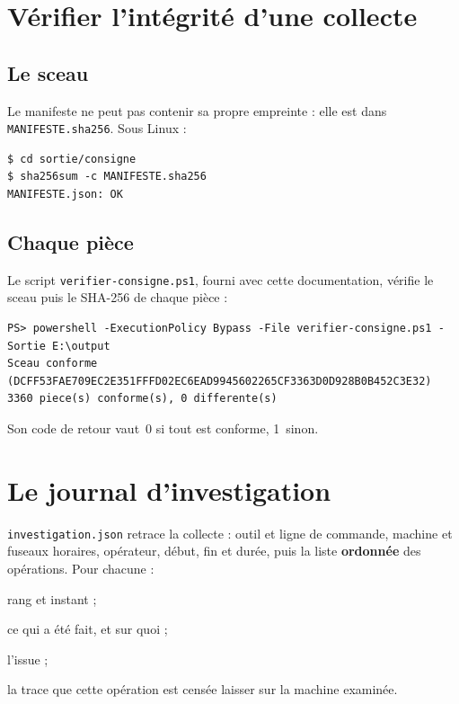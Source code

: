 \documentclass[11pt,a4paper,oneside]{report}
\newcommand{\champ}[1]{\texttt{#1}}
\newcommand{\fichier}[1]{\texttt{#1}}
\begin{document}
\section{Vérifier l'intégrité d'une collecte}\label{sec:verif}

\subsection{Le sceau}

Le manifeste ne peut pas contenir sa propre empreinte : elle est dans
\fichier{MANIFESTE.sha256}. Sous Linux :

\begin{lstlisting}
$ cd sortie/consigne
$ sha256sum -c MANIFESTE.sha256
MANIFESTE.json: OK
\end{lstlisting}

\subsection{Chaque pièce}

Le script \fichier{verifier-consigne.ps1}, fourni avec cette documentation,
vérifie le sceau puis le SHA-256 de chaque pièce :

\begin{lstlisting}
PS> powershell -ExecutionPolicy Bypass -File verifier-consigne.ps1 -Sortie E:\output
Sceau conforme (DCFF53FAE709EC2E351FFFD02EC6EAD9945602265CF3363D0D928B0B452C3E32)
3360 piece(s) conforme(s), 0 differente(s)
\end{lstlisting}

Son code de retour vaut~0 si tout est conforme, 1~sinon.



\section{Le journal d'investigation}

\fichier{investigation.json} retrace la collecte : outil et ligne de commande,
machine et fuseaux horaires, opérateur, début, fin et durée, puis la liste
\textbf{ordonnée} des opérations. Pour chacune :

\begin{description}[style=nextline,leftmargin=1.2em]
  \item[\champ{Seq}, \champ{TimestampUtc}, \champ{TimestampLocal}] rang et instant ;
  \item[\champ{Operation}, \champ{Target}] ce qui a été fait, et sur quoi ;
  \item[\champ{Result}] l'issue ;
  \item[\champ{Footprint}] la trace que cette opération est censée laisser sur la
        machine examinée.
\end{description}
\end{document}
